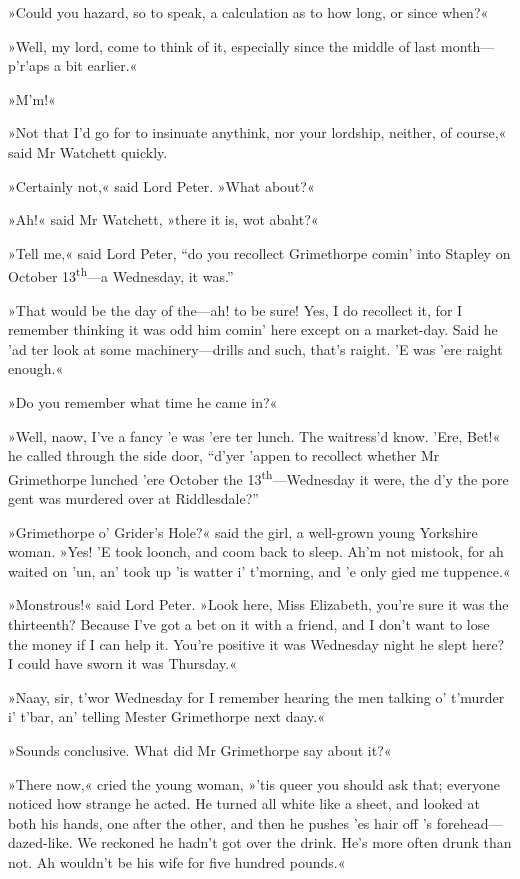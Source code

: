 »Could you hazard, so to speak, a calculation as to how long, or since when?«

»Well, my lord, come to think of it, especially since the middle of last month\allowbreak---\allowbreak p'r'aps a bit earlier.«

»M'm!«

»Not that I'd go for to insinuate anythink, nor your lordship, neither, of course,« said Mr Watchett quickly.

»Certainly not,« said Lord Peter. »What about?«

»Ah!« said Mr Watchett, »there it is, wot abaht?«

»Tell me,« said Lord Peter, \enquote{do you recollect Grimethorpe comin' into Stapley on October 13\textsuperscript{th}---a Wednesday, it was.}

»That would be the day of the\allowbreak---\allowbreak ah! to be sure! Yes, I do recollect it, for I remember thinking it was odd him comin' here except on a market-day. Said he 'ad ter look at some machinery\allowbreak---\allowbreak drills and such, that's raight. 'E was 'ere raight enough.«

»Do you remember what time he came in?«

»Well, naow, I've a fancy 'e was 'ere ter lunch. The waitress'd know. 'Ere, Bet!« he called through the side door, \enquote{d'yer 'appen to recollect whether Mr Grimethorpe lunched 'ere October the 13\textsuperscript{th}---Wednesday it were, the d'y the pore gent was murdered over at Riddlesdale?}

»Grimethorpe o' Grider's Hole?« said the girl, a well-grown young Yorkshire woman. »Yes! 'E took loonch, and coom back to sleep. Ah'm not mistook, for ah waited on 'un, an' took up 'is watter i' t'morning, and 'e only gied me tuppence.«

»Monstrous!« said Lord Peter. »Look here, Miss Elizabeth, you're sure it was the thirteenth? Because I've got a bet on it with a friend, and I don't want to lose the money if I can help it. You're positive it was Wednesday night he slept here? I could have sworn it was Thursday.«

»Naay, sir, t'wor Wednesday for I remember hearing the men talking o' t'murder i' t'bar, an' telling Mester Grimethorpe next daay.«

»Sounds conclusive. What did Mr Grimethorpe say about it?«

»There now,« cried the young woman, »'tis queer you should ask that; everyone noticed how strange he acted. He turned all white like a sheet, and looked at both his hands, one after the other, and then he pushes 'es hair off 's forehead\allowbreak---\allowbreak dazed-like. We reckoned he hadn't got over the drink. He's more often drunk than not. Ah wouldn't be his wife for five hundred pounds.«

